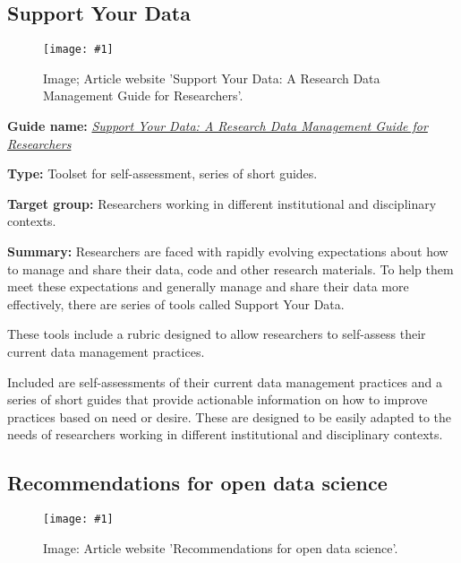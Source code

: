 \documentclass{article}
\newlength{\imgwidth}
\newcommand\scaledgraphics[2]{%
                
\settowidth{\imgwidth}{\texttt{[image: \#1]}}%
                
\setlength{\imgwidth}{\minof{\imgwidth}{#2\textwidth}}%
                
\texttt{[image: \#1]}%
                
}
\begin{document}
\subsection{Support Your Data}\label{H2541051}



\begin{center}
\begin{figure}
\scaledgraphics{45bdf5de-7e5b-448d-820a-d3b3288a4dbe.png}{0.5}
\caption*{Image; Article website 'Support Your Data: A Research Data Management Guide for Researchers'.}\label{F88206441}
\end{figure}


\end{center}


\textbf{Guide name:} \emph{\href{https://riojournal.com/articles.php?id=26439}{Support Your Data: A Research Data Management Guide for Researchers}} \autocite{borghi_support_2018}


\textbf{Type:} Toolset for self-assessment, series of short guides.


\textbf{Target group:} Researchers working in different institutional and disciplinary contexts.


\textbf{Summary:} Researchers are faced with rapidly evolving expectations about how to manage and share their data, code and other research materials. To help them meet these expectations and generally manage and share their data more effectively, there are series of tools called Support Your Data.


These tools include a rubric designed to allow researchers to self-assess their current data management practices.


Included are self-assessments of their current data management practices and a series of short guides that provide actionable information on how to improve practices based on need or desire. These are designed to be easily adapted to the needs of researchers working in different institutional and disciplinary contexts.


\subsection{Recommendations for open data science}\label{H2986141}


\begin{figure}
\scaledgraphics{10e3bc75-5c14-48e3-a161-d685105f455b.png}{1}
\caption*{Image: Article website 'Recommendations for open data science'. }\label{F57414871}
\end{figure}
\end{document}
